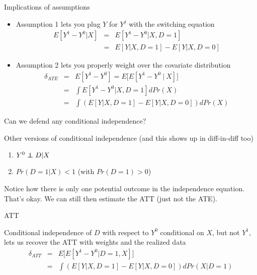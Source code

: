 \documentclass{beamer}
\newcommand\independent{\protect\mathpalette{\protect\independenT}{\perp}}
\def\independenT#1#2{\mathrel{\rlap{$#1#2$}\mkern2mu{#1#2}}}
\begin{document}
\begin{frame}{Implications of assumptions}


	\begin{itemize}
	\item Assumption 1 lets you plug $Y$ for $Y^j$ with the switching equation
		\begin{eqnarray*}
		E[Y^1-Y^0|X] &=& E[Y^1 - Y^0 | X,D=1] \\
		&=&E[Y|X,D=1] - E[Y|X,D=0]
		\end{eqnarray*}
	\item Assumption 2 lets you properly weight over the covariate distribution
		\begin{eqnarray*}
		\delta_{ATE} &=&E[Y^1-Y^0] = E\bigg[ E[Y^1 - Y^0 \ \vert \ X] \bigg] \\
		&=& \int E[Y^1 - Y^0 |X,D=1] dPr(X) \\
		&=& \int \left(E[Y|X,D=1] - E[Y|X,D=0]\right)dPr(X)
		\end{eqnarray*}
	\end{itemize}

\end{frame}




\begin{frame}{Can we defend any conditional independence?}

Other versions of conditional independence (and this shows up in diff-in-diff too)

\begin{enumerate}
  \item $Y^0 \independent{D} | X$ 
  \item $Pr(D=1|X)<1$ (with $Pr(D=1)>0$)
\end{enumerate}

\bigskip
Notice how there is only one potential outcome in the independence equation.  That's okay.  We can still then estimate the ATT (just not the ATE).

\end{frame}

\begin{frame}{ATT}

Conditional independence of $D$ with respect to $Y^0$ conditional on $X$, but not $Y^1$, lets us recover the ATT with weights and the realized data
		\begin{eqnarray*}
		\delta_{ATT} &=& E\bigg[ E[Y^1-Y^0 | D=1,X] \bigg] \\
		&=& \int \left(E[Y|X,D=1] - E[Y|X,D=0]\right)dPr(X|D=1)
		\end{eqnarray*}
\end{frame}
\end{document}
